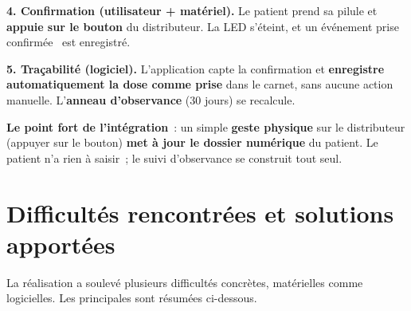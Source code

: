 \documentclass[11pt,a4paper]{report}
\begin{document}
\begin{stepbox}
\textbf{4. Confirmation (utilisateur + mat\'eriel).} Le patient prend sa pilule et
\textbf{appuie sur le bouton} du distributeur. La LED s'\'eteint, et un \'ev\'enement \og
prise confirm\'ee \fg\ est enregistr\'e.
\end{stepbox}

\begin{stepbox}
\textbf{5. Tra\c cabilit\'e (logiciel).} L'application capte la confirmation et
\textbf{enregistre automatiquement la dose comme \og prise \fg} dans le carnet, sans aucune
action manuelle. L'\textbf{anneau d'observance} (30 jours) se recalcule.
\end{stepbox}

\begin{infobox}
\textbf{Le point fort de l'int\'egration}~: un simple \textbf{geste physique} sur le
distributeur (appuyer sur le bouton) \textbf{met \`a jour le dossier num\'erique} du patient.
Le patient n'a rien \`a saisir~; le suivi d'observance se construit tout seul.
\end{infobox}

\section{Difficult\'es rencontr\'ees et solutions apport\'ees}

La r\'ealisation a soulev\'e plusieurs difficult\'es concr\`etes, mat\'erielles comme
logicielles. Les principales sont r\'esum\'ees ci-dessous.
\end{document}

